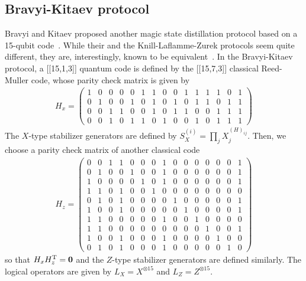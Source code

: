  \subsection{Bravyi-Kitaev protocol}
Bravyi and Kitaev proposed another magic state distillation protocol based on a 15-qubit code~\cite{Magic}.
While their and the Knill-Laflamme-Zurek protocols seem quite different, they are, interestingly, known to be equivalent~\cite{Reichardt05}.
In the Bravyi-Kitaev protocol, a [[15,1,3]] quantum code is defined by the [[15,7,3]] classical Reed-Muller code, whose parity check matrix is given by
\begin{eqnarray}
H_x= \left( 
\begin{array}{ccccccccccccccc}
1 & 0 &0 &0 &0 &1 & 1& 0& 0& 1& 1 & 1& 1& 0 & 1
\\
0 & 1 & 0 & 0& 1 & 0 & 1 & 0 & 1 & 0 & 1 & 1 & 0 & 1 & 1 
\\
0 & 0 & 1 & 1 & 0 & 0 &1 & 0 & 1 & 1 & 0 & 0& 1 & 1 & 1 
\\
0 & 0& 1 & 0 & 1 & 1 & 0 & 1 & 0 & 0& 1 & 0& 1 & 1& 1
\end{array}
\right)
\end{eqnarray}
The $X$-type stabilizer generators are defined by $S_X^{(i)}= \prod _j X_j^{(H)_{ij}}$.
Then, we choose a parity check matrix of another classical code
\begin{eqnarray}
H_z= \left( 
\begin{array}{ccccccccccccccc}
0 & 0 &1 &1 &0 &0 & 0& 1& 0& 0& 0 & 0& 0& 0 & 1
\\
0 & 1 &0 &0 &1 &0 & 0& 1& 0& 0& 0 & 0& 0& 0 & 1
\\
1 & 0 &0 &0 &0 &1 & 0& 1& 0& 0& 0 & 0& 0& 0 & 1
\\
1 & 1 &0 &1 &0 &0 & 1& 0& 0& 0& 0 & 0& 0& 0 & 0
\\
0 & 1 &0 &1 &0 &0 & 0& 0& 1& 0& 0 & 0& 0& 0 & 1
\\
1 & 0 &0 &1 &0 &0 & 0& 0& 0& 1& 0 & 0& 0& 0 & 1
\\
1 & 1 &0 &0 &0 &0 & 0& 1& 0& 0& 1 & 0& 0& 0 & 0
\\
1 & 1 &0 &0 &0 &0 & 0& 0& 0& 0& 0 & 1& 0& 0 & 1
\\
1 & 0 &0 &1 &0 &0 & 0& 1& 0& 0& 0 & 0& 1& 0 & 0
\\
0 & 1 &0 &1 &0 &0 & 0& 1& 0& 0& 0 & 0& 0& 1 & 0
\end{array}
\right)
\end{eqnarray}
so that $H_x H_z^{\rm T}=\mathbf{0}$ and the $Z$-type stabilizer generators are defined similarly.
The logical operators are given by $L_X=X^{\otimes 15}$ and $L_Z=Z^{\otimes 15}$.
